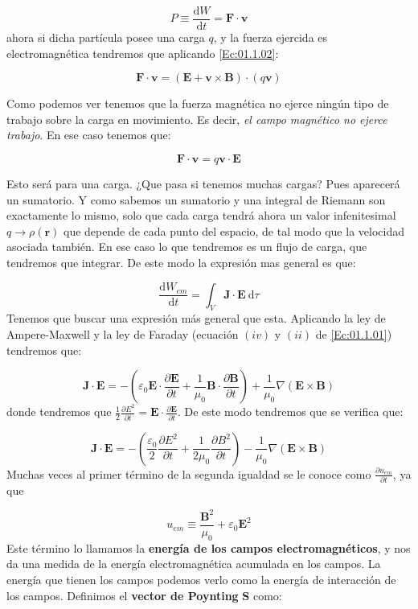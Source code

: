 \documentclass[12pt,a4paper]{article}
\newcommand{\parentesis}[1]{\left( #1  \right)}
\newcommand{\parciales}[2]{\frac{\partial #1}{\partial #2}}
\newcommand{\D}{\mathrm{d}}
\newcommand{\Bn}{\mathbf{B}}
\newcommand{\En}{\mathbf{E}}
\newcommand{\Jn}{\mathbf{J}}
\newcommand{\Fn}{\mathbf{F}}
\newcommand{\vn}{\mathbf{v}}
\newcommand{\rn}{\mathbf{r}}
\newcommand{\Sn}{\mathbf{S}}
\numberwithin{equation}{section}
\numberwithin{figure}{section}
\begin{document}
\begin{equation}
P \equiv \dfrac{\D W}{\D t} = \Fn \cdot \vn
\end{equation} 
ahora si dicha partícula posee una carga $q$, y la fuerza ejercida es electromagnética tendremos que aplicando \ref{Ec:01.1.02}:

$$  \Fn \cdot \vn = (\En + \vn \times \Bn) \cdot (q \vn) $$

Como podemos ver tenemos que la fuerza magnética no ejerce ningún tipo de trabajo sobre la carga en movimiento. Es decir, \textit{el campo magnético no ejerce trabajo}. En ese caso tenemos que:

$$ \Fn \cdot \vn = q \vn \cdot \En $$

Esto será para una carga. ¿Que pasa si tenemos muchas cargas? Pues aparecerá un sumatorio. Y como sabemos un sumatorio y una integral de Riemann son exactamente lo mismo, solo que cada carga tendrá ahora un valor infenitesimal $q \rightarrow \rho(\rn)$ que depende de cada punto del espacio, de tal modo que la velocidad asociada también. En ese caso lo que tendremos es un flujo de carga, que tendremos que integrar. De este modo la expresión mas general es que:

\begin{equation}
\dfrac{\D W_{em}}{\D t} = \int_V \Jn \cdot \En  \ \D  \tau
\end{equation}
Tenemos que buscar una expresión más general que esta. Aplicando la ley de Ampere-Maxwell y la ley de Faraday (ecuación $(iv)$ y $(ii)$ de \ref{Ec:01.1.01})  tendremos que:

\begin{equation}
\Jn  \cdot \En = -\parentesis{\varepsilon_0 \En \cdot \parciales{\En}{t} + \dfrac{1}{\mu_0} \Bn \cdot \parciales{\Bn}{t}}  +  \dfrac{1}{\mu_0} \nabla (\En \times \Bn) 
\end{equation}
donde tendremos que $\frac{1}{2}\parciales{E^2}{t} = \En \cdot \parciales{\En}{t}$. De este modo tendremos que se verifica que:


\begin{equation}
\Jn  \cdot \En = -\parentesis{\dfrac{\varepsilon_0}{2} \parciales{E^2}{t} + \dfrac{1}{2 \mu_0} \parciales{B^2}{t}}  -  \dfrac{1}{\mu_0} \nabla (\En \times \Bn) 
\end{equation}
Muchas veces al primer término de la segunda igualdad se le conoce como $\parciales{u_{em}}{t}$, ya que

\begin{equation}
u_{em} \equiv \dfrac{\Bn^2}{\mu_0} + \varepsilon_0 \En^2 
\end{equation}
Este término lo llamamos la \textbf{energía de los campos electromagnéticos}, y nos da una medida de la energía electromagnética acumulada en los campos. La energía que tienen los campos podemos verlo como la energía de interacción de los campos. Definimos el \textbf{vector de Poynting} $\Sn$ como: \\
\end{document}
